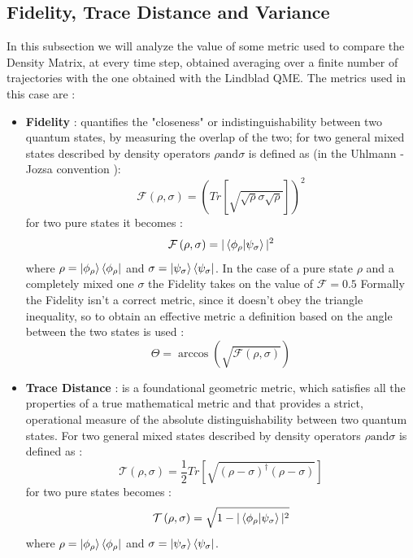 \documentclass[a4paper,12pt]{article}
\begin{document}
\subsection{Fidelity, Trace Distance and Variance}
\label{sub:Fidelity_Trace_Distance_Variance}
In this subsection we will analyze the value of some metric used to compare the Density Matrix, at every time step, obtained averaging over a finite number of trajectories with the one obtained with the Lindblad QME. The metrics used in this case are : 
\begin{itemize}
	\item \textbf{Fidelity} : quantifies the "closeness" or indistinguishability between two quantum states, by measuring the overlap of the two; for two general mixed states  described by density operators $ \rho \text{and} \sigma $ is defined as (in the Uhlmann - Jozsa convention ):
	\begin{equation}
		\mathcal{F} \left( \rho, \sigma \right) = \left( Tr\left[ \sqrt{\sqrt{\rho} \sigma \sqrt{\rho}} \right] \right)^{2} 
	\end{equation}
	for two pure states it becomes : 
	\begin{equation}
		\mathcal{F} \left( \rho, \sigma \right) = | \braket{\phi_{\rho} | \psi_{\sigma}} |^{2}
	\end{equation}
	where $ \rho = \ket{\phi_{\rho}}\bra{\phi_{\rho}} $ and $ \sigma = \ket{\psi_{\sigma}}\bra{\psi_{\sigma}} $. \newline
	In the case of a pure state $ \rho $ and a completely mixed one $ \sigma $ the Fidelity takes on the value of $ \mathcal{F} = 0.5 $ \newline
	Formally the Fidelity isn't a correct metric, since it doesn't obey the triangle inequality, so to obtain an effective metric a definition based on the angle between the two states is used : 
	\begin{equation}
		\Theta = \arccos{\left( \sqrt{\mathcal{F} \left( \rho, \sigma \right)} \right)}
	\end{equation}
	
	\item \textbf{Trace Distance} : is a foundational geometric metric, which satisfies all the properties of a true mathematical metric and that provides a strict, operational measure of the absolute distinguishability between two quantum states. \newline
	For two general mixed states  described by density operators $ \rho \text{and} \sigma $ is defined as :
	\begin{equation}
		\mathcal{T} \left( \rho, \sigma \right) = \frac{1}{2} Tr \left[ \sqrt{ \left( \rho - \sigma \right)^{\dagger} \left( \rho - \sigma \right) } \right]
	\end{equation}
	for two pure states becomes :
	\begin{equation}
		\mathcal{T} \left( \rho, \sigma \right) = \sqrt{1 - | \braket{\phi_{\rho} | \psi_{\sigma}} |^{2}}
	\end{equation}
	where $ \rho = \ket{\phi_{\rho}}\bra{\phi_{\rho}} $ and $ \sigma = \ket{\psi_{\sigma}}\bra{\psi_{\sigma}} $. \newline
\end{itemize}    
\end{document}
